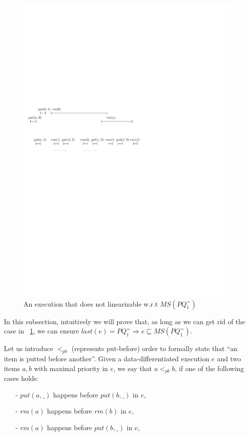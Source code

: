 \begin{figure}[htbp]
  \centering
  \includegraphics[width=0.6 \textwidth]{figures/PIC-HIS-INTRO-PB-ORDER.pdf}
  \caption{An execution that does not linearizable w.r.t $\textit{MS}(\textit{PQ}_1^{=})$}
  \label{fig:introduce pb order}
\end{figure}

In this subsection, intuitively we will prove that, as long as we can get rid of the case in \figurename~\ref{fig:introduce pb order}, we can ensure $\textit{last}(e) = \textit{PQ}_1^{=} \Rightarrow e \sqsubseteq \textit{MS}(\textit{PQ}_1^{=})$.

Let us introduce $<_{\textit{pb}}$ (represents put-before) order to formally state that ``an item is putted before another''. Given a data-differentiated execution $e$ and two items $a,b$ with maximal priority in $e$,  we say that $a <_{\textit{pb}} b$, if one of the following cases holds:

\begin{itemize}
\setlength{\itemsep}{0.5pt}
\item[-] $\textit{put}(a,\_)$ happens before $\textit{put}(b,\_)$ in $e$,

\item[-] $\textit{rm}(a)$ happens before $\textit{rm}(b)$ in $e$,

\item[-] $\textit{rm}(a)$ happens before $\textit{put}(b,\_)$ in $e$,
\end{itemize}

